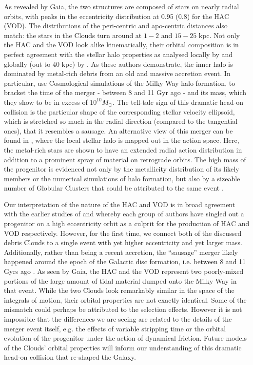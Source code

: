 \documentclass[a4paper,useAMS,usenatbib]{mnras}
\begin{document}
As revealed by Gaia, the two structures are composed of stars on
nearly radial orbits, with peaks in the eccentricity distribution at
0.95 (0.8) for the HAC (VOD). The distributions of the peri-centric
and apo-centric distances also match: the stars in the Clouds turn
around at $1-2$ and $15-25$ kpc. Not only the HAC and the VOD look
alike kinematically, their orbital composition is in perfect agreement
with the stellar halo properties as analysed locally by
\citet{Belokurov2018} and globally (out to 40 kpc) by
\citet{Deason2018pileup}. As these authors demonstrate, the inner halo
is dominated by metal-rich debris from an old and massive accretion
event. In particular, \citet{Belokurov2018} use Cosmological
simulations of the Milky Way halo formation, to bracket the time of
the merger - between 8 and 11 Gyr ago - and its mass, which they show
to be in excess of $10^{10} M_{\odot}$. The tell-tale sign of this
dramatic head-on collision is the particular shape of the
corresponding stellar velocity ellipsoid, which is stretched so much
in the radial direction (compared to the tangential ones), that it
resembles a sausage. An alternative view of this merger can be found
in \citet{actionhalo}, where the local stellar halo is mapped out in
the action space. Here, the metal-rich stars are shown to have an
extended radial action distribution in addition to a prominent spray
of material on retrograde orbits. The high mass of the progenitor is
evidenced not only by the metallicity distribution of its likely
members or the numerical simulations of halo formation, but also by a
sizeable number of Globular Clusters that could be attributed to the
same event \citep[see][]{sausagegc,Kruijssen2018}.

Our interpretation of the nature of the HAC and VOD is in broad
agreement with the earlier studies of \citet{Jo2012} and \citet{Ca12}
whereby each group of authors have singled out a progenitor on a high
eccentricity orbit as a culprit for the production of HAC and VOD
respectively. However, for the first time, we connect both of the
discussed debris Clouds to a single event with yet higher eccentricity
and yet larger mass. Additionally, rather than being a recent
accretion, the ``sausage'' merger likely happened around the epoch of
the Galactic disc formation, i.e. between 8 and 11 Gyrs ago
\citep[see][]{Belokurov2018,Helmi2018}. As seen by Gaia, the HAC and
the VOD represent two poorly-mixed portions of the large amount of
tidal material dumped onto the Milky Way in that event. While the two
Clouds look remarkably similar in the space of the integrals of
motion, their orbital properties are not exactly identical. Some of
the mismatch could perhaps be attributed to the selection
effects. However it is not impossible that the differences we are
seeing are related to the details of the merger event itself, e.g. the
effects of variable stripping time or the orbital evolution of the
progenitor under the action of dynamical friction. Future models of
the Clouds' orbital properties \citep[along the lines of the ideas
  laid out in e.g.][]{Jo2012,Sanderson2013} will inform our
understanding of this dramatic head-on collision that re-shaped the
Galaxy.
\end{document}
